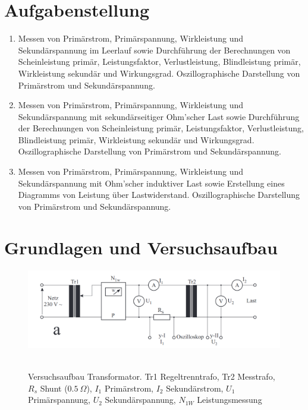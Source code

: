 \documentclass{article}
\begin{document}
\parindent0cm




\pagestyle{fancy}

\section{Aufgabenstellung}

\begin{enumerate}
\item Messen von Primärstrom, Primärspannung, Wirkleistung und Sekundärspannung im Leerlauf sowie Durchführung der Berechnungen von Scheinleistung primär, Leistungsfaktor, Verlustleistung, Blindleistung primär, Wirkleistung sekundär und Wirkungsgrad. Oszillographische Darstellung von Primärstrom und Sekundärspannung.
\item Messen von Primärstrom, Primärspannung, Wirkleistung und Sekundärspannung mit sekundärseitiger Ohm’scher Last sowie Durchführung der Berechnungen von Scheinleistung primär, Leistungsfaktor, Verlustleistung, Blindleistung primär, Wirkleistung sekundär und Wirkungsgrad. Oszillographische Darstellung von Primärstrom und Sekundärspannung.
\item Messen von Primärstrom, Primärspannung, Wirkleistung und Sekundärspannung mit Ohm'scher induktiver Last sowie Erstellung eines Diagramms von Leistung über Lastwiderstand. Oszillographische Darstellung von Primärstrom und Sekundärspannung.
\end{enumerate}



\section{Grundlagen und Versuchsaufbau}




\begin{figure}[H]
\caption{Versuchsaufbau Transformator. Tr1 Regeltrenntrafo, Tr2 Messtrafo, $R_s$ Shunt ($0.5~\Omega$), $I_1$ Primärstrom, $I_2$ Sekundärstrom, $U_1$ Primärspannung, $U_2$ Sekundärspannung, $N_{1W}$ Leistungsmessung}
\label{fig:pic1}
{\centering
\includegraphics[scale=0.9]{pic1.png}
~
}
\end{figure}
\end{document}
